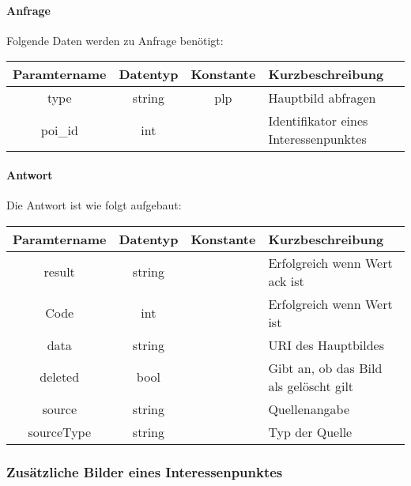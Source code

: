 \paragraph{Anfrage}Folgende Daten werden zu Anfrage benötigt:
\begin{table}[H]
	\begin{tabular}{|c|c|c|p{6.5cm}|}
		\hline
		\textbf{Paramtername} & \textbf{Datentyp} & \textbf{Konstante} & \textbf{Kurzbeschreibung}                                                                                               \\ \hline
		type                & string            & plp                & Hauptbild abfragen \\ \hline
		poi\_id             & int               &                    & Identifikator eines Interessenpunktes \\ \hline
	\end{tabular}
\end{table}
\paragraph{Antwort}Die Antwort ist wie folgt aufgebaut:
\begin{table}[H]
	\begin{tabular}{|c|c|c|p{6.5cm}|}
		\hline
		\textbf{Paramtername} & \textbf{Datentyp} & \textbf{Konstante} & \textbf{Kurzbeschreibung}                                                                                               \\ \hline
		result              & string           &                 & Erfolgreich wenn Wert {\glqq ack\grqq} ist \\ \hline
		Code                & int              &                 & Erfolgreich wenn Wert {\glqq 0\grqq} ist \\ \hline
		data                & string           &                 & URI des Hauptbildes \\ \hline
		deleted             & bool             &                 & Gibt an, ob das Bild als gelöscht gilt \\ \hline
		source              & string           &                 & Quellenangabe \\ \hline
		sourceType          & string           &                 & Typ der Quelle \\ \hline
	\end{tabular}
\end{table}

\subsubsection{Zusätzliche Bilder eines Interessenpunktes}
